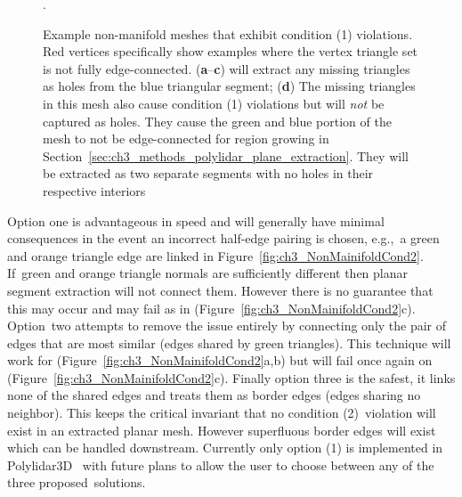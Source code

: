 \begin{figure}[H]
\begin{subfigure}{.24\linewidth}
    \caption{\label{fig:ch3_NonMainifoldCond1D}}\vspace{6pt}
  \end{subfigure}
  \caption{Example non-manifold meshes that exhibit condition (1) violations. Red vertices specifically show examples where the vertex triangle set is not fully edge-connected. (\textbf{a}--\textbf{c}) will extract any missing triangles as holes from the blue triangular segment;  (\textbf{d}) The missing triangles in this mesh also cause condition (1) violations but will \emph{not} be captured as holes. They cause the green and blue portion of the mesh to not be edge-connected for region growing in Section~\ref{sec:ch3_methods_polylidar_plane_extraction}. They will be extracted as two separate segments with no holes in their respective interiors}. \label{fig:ch3_NonMainifoldCond1}
\end{figure}

\vspace{-6pt}

Option one is advantageous in speed and will generally have minimal consequences in the event an incorrect half-edge pairing is chosen, e.g.,~a green and orange triangle edge are linked in Figure~\ref{fig:ch3_NonMainifoldCond2}. If~green and orange triangle normals are sufficiently different then planar segment extraction will not connect them. However there is no guarantee that this may occur and may fail as in (Figure~\ref{fig:ch3_NonMainifoldCond2}c). Option~two attempts to remove the issue entirely by connecting only the pair of edges that are most similar (edges shared by green triangles). This technique will work for (Figure~\ref{fig:ch3_NonMainifoldCond2}a,b) but will fail once again on (Figure~\ref{fig:ch3_NonMainifoldCond2}c). Finally option three is the safest, it links none of the shared edges and treats them as border edges (edges sharing no neighbor).  This keeps the critical invariant that no condition (2)~violation will exist in an extracted planar mesh. However superfluous border edges will exist which can be handled downstream. Currently only option (1) is implemented in Polylidar3D~\cite{Castagno_Github_Polylidar} with future plans to allow the user to choose between any of the three proposed~solutions. 


